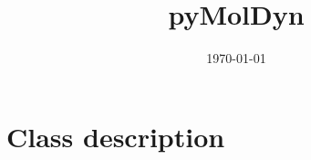 \documentclass[final, oneside, a4paper, 11pt, pdftex, english]{scrreprt}
\begin{document}
\title{pyMolDyn}
\date{\today}
\maketitle

\tableofcontents


\chapter{Class description}


\end{document}

